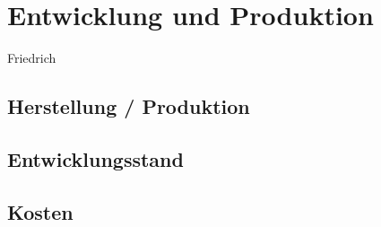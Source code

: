 
\section{Entwicklung und Produktion}
Friedrich

\subsection{Herstellung / Produktion}
\subsection{Entwicklungsstand}
\subsection{Kosten}